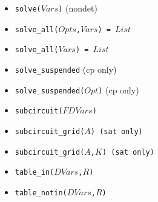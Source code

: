 \documentclass[10pt]{article}
\begin{document}
\begin{multicols}{2}
\begin{scriptsize}
\begin{itemize}
\item \texttt{solve($Vars$)} (nondet)
\item \texttt{solve\_all($Opts$,$Vars$) = $List$}
\item \texttt{solve\_all($Vars$) = $List$}
\item \texttt{solve\_suspended} (cp only)
\item \texttt{solve\_suspended($Opt$)} (cp only)
\item \texttt{subcircuit($FDVars$)}
\item \texttt{subcircuit\_grid($A$) (sat only)}
\item \texttt{subcircuit\_grid($A$,$K$) (sat only)} 
\item \texttt{table\_in($DVars$,$R$)}
\item \texttt{table\_notin($DVars$,$R$)}
\end{itemize}
\end{scriptsize}

\end{multicols}
\end{document}
